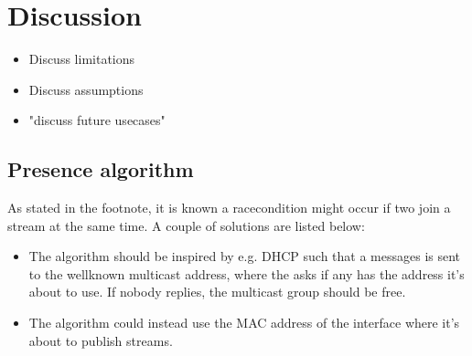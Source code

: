 \chapter{Discussion}\label{chp:discussion}
\begin{itemize}
	\item Discuss limitations
	\item Discuss assumptions
	\item "discuss future usecases"
\end{itemize}


\section{Presence algorithm}
As stated in the footnote, it is known a racecondition might occur if two \pubs{} join a stream at the same time. A couple of solutions are listed below:
\begin{itemize}
	\item The algorithm should be inspired by e.g. \ac{DHCP} such that a messages is sent to the wellknown multicast address, where the \pub{} asks if any has the address it's about to use. If nobody replies, the multicast group should be free.
	
	\item The algorithm could instead use the \ac{MAC} address of the interface where it's about to publish streams. 
\end{itemize}
